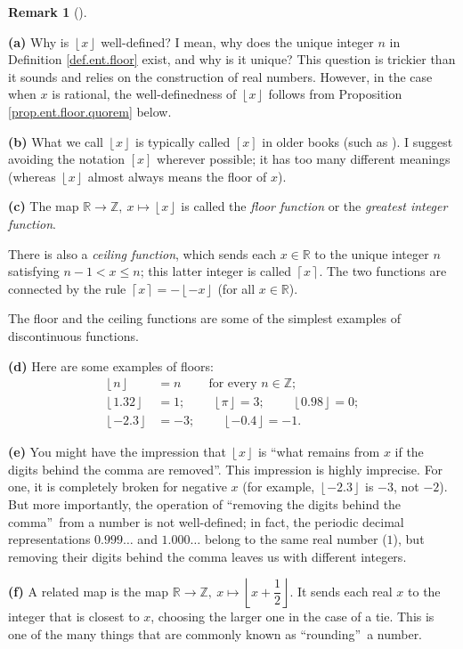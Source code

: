 \documentclass[numbers=enddot,12pt,final,onecolumn,notitlepage]{scrartcl}%
\numberwithin{exer}{subsection}
\theoremstyle{definition}
\newtheorem{remk}[theo]{Remark}
\newenvironment{remark}[1][]
{\begin{remk}[#1]\begin{leftbar}}
{\end{leftbar}\end{remk}}
\begin{document}
\begin{remark}
\label{rmk.ent.floor}\textbf{(a)} Why is $\left\lfloor x\right\rfloor $
well-defined? I mean, why does the unique integer $n$ in Definition
\ref{def.ent.floor} exist, and why is it unique? This question is trickier
than it sounds and relies on the construction of real numbers. However, in the
case when $x$ is rational, the well-definedness of $\left\lfloor
x\right\rfloor $ follows from Proposition \ref{prop.ent.floor.quorem} below.

\textbf{(b)} What we call $\left\lfloor x\right\rfloor $ is typically called
$\left[  x\right]  $ in older books (such as \cite{NiZuMo91}). I suggest
avoiding the notation $\left[  x\right]  $ wherever possible; it has too many
different meanings (whereas $\left\lfloor x\right\rfloor $ almost always means
the floor of $x$).

\textbf{(c)} The map $\mathbb{R}\rightarrow\mathbb{Z},\ x\mapsto\left\lfloor
x\right\rfloor $ is called the \textit{floor function} or the \textit{greatest
integer function}.

There is also a \textit{ceiling function}, which sends each $x\in\mathbb{R}$
to the unique integer $n$ satisfying $n-1<x\leq n$; this latter integer is
called $\left\lceil x\right\rceil $. The two functions are connected by the
rule $\left\lceil x\right\rceil =-\left\lfloor -x\right\rfloor $ (for all
$x\in\mathbb{R}$).

The floor and the ceiling functions are some of the simplest examples of
discontinuous functions.

\textbf{(d)} Here are some examples of floors:%
\begin{align*}
\left\lfloor n\right\rfloor  &  =n\ \ \ \ \ \ \ \ \ \ \text{for every }%
n\in\mathbb{Z};\\
\left\lfloor 1.32\right\rfloor  &  =1;\ \ \ \ \ \ \ \ \ \ \left\lfloor
\pi\right\rfloor =3;\ \ \ \ \ \ \ \ \ \ \left\lfloor 0.98\right\rfloor =0;\\
\left\lfloor -2.3\right\rfloor  &  =-3;\ \ \ \ \ \ \ \ \ \ \left\lfloor
-0.4\right\rfloor =-1.
\end{align*}


\textbf{(e)} You might have the impression that $\left\lfloor x\right\rfloor $
is \textquotedblleft what remains from $x$ if the digits behind the comma are
removed\textquotedblright. This impression is highly imprecise. For one, it is
completely broken for negative $x$ (for example, $\left\lfloor
-2.3\right\rfloor $ is $-3$, not $-2$). But more importantly, the operation of
\textquotedblleft removing the digits behind the comma\textquotedblright\ from
a number is not well-defined; in fact, the periodic decimal representations
$0.999\ldots$ and $1.000\ldots$ belong to the same real number ($1$), but
removing their digits behind the comma leaves us with different integers.

\textbf{(f)} A related map is the map $\mathbb{R}\rightarrow\mathbb{Z}%
,\ x\mapsto\left\lfloor x+\dfrac{1}{2}\right\rfloor $. It sends each real $x$
to the integer that is closest to $x$, choosing the larger one in the case of
a tie. This is one of the many things that are commonly known as
\textquotedblleft rounding\textquotedblright\ a number.
\end{remark}
\end{document}
